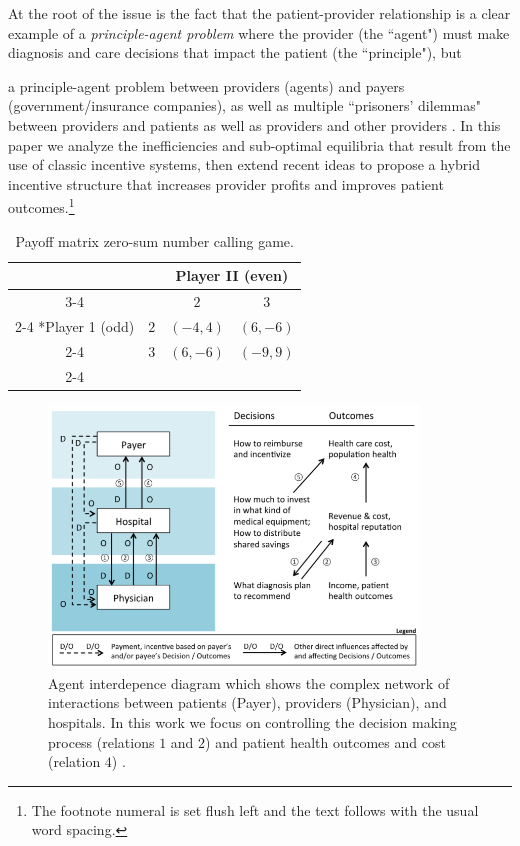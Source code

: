 \documentclass[a4paper]{llncs}
\begin{document}
At the root of the issue is the fact that the patient-provider relationship is a clear example of a \emph{principle-agent problem} \cite{principle} where the provider (the ``agent") must make diagnosis and care decisions that impact the patient (the ``principle"), but 

a principle-agent problem between providers (agents) and payers (government/insurance companies), as well as multiple ``prisoners' dilemmas" between providers and patients as well as providers and other providers \cite{blended}. In this paper we analyze the inefficiencies and sub-optimal equilibria that result from the use of classic incentive systems, then extend recent ideas to propose a hybrid incentive structure that increases provider profits and improves patient outcomes.\footnote{The footnote numeral is set flush left and the text follows with the usual word spacing.}


\begin{table}[H]
\centering
  \setlength{\extrarowheight}{2pt}
  \begin{tabular}{*{4}{c|}}
    \multicolumn{2}{c}{} & \multicolumn{2}{c}{Player II (even)}\\\cline{3-4}
    \multicolumn{1}{c}{} &  & $2$  & $3$ \\\cline{2-4}
    \multirow{2}*{Player 1 (odd)}  & $2$ & $(-4,4)$ & $(6,-6)$ \\\cline{2-4}
    & $3$ & $(6,-6)$ & $(-9,9)$ \\\cline{2-4}
  \end{tabular}
\caption{Payoff matrix zero-sum number calling game.}
\end{table}

\begin{figure}
\includegraphics[height=7cm]{agentdep}
\centering
\caption{Agent interdepence diagram which shows the complex network of interactions between patients (Payer), providers (Physician), and hospitals. In this work we focus on controlling the decision making process (relations $1$ and $2$) and patient health outcomes and cost (relation $4$) \cite{msdt}.}
\label{fig:agentdep}
\end{figure}
\end{document}
